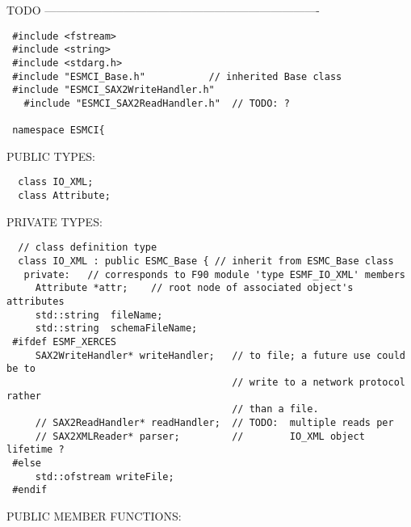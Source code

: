     TODO
  -------------------------------------------------------------------------
  
\begin{verbatim} #include <fstream>
 #include <string>
 #include <stdarg.h>
 #include "ESMCI_Base.h"           // inherited Base class
 #include "ESMCI_SAX2WriteHandler.h"
   #include "ESMCI_SAX2ReadHandler.h"  // TODO: ?
 
 namespace ESMCI{
 \end{verbatim}{\sf PUBLIC TYPES:}
\begin{verbatim}  class IO_XML;
  class Attribute;
 \end{verbatim}{\sf PRIVATE TYPES:}
\begin{verbatim} 
  // class definition type
  class IO_XML : public ESMC_Base { // inherit from ESMC_Base class
   private:   // corresponds to F90 module 'type ESMF_IO_XML' members
     Attribute *attr;    // root node of associated object's attributes
     std::string  fileName;
     std::string  schemaFileName;
 #ifdef ESMF_XERCES
     SAX2WriteHandler* writeHandler;   // to file; a future use could be to 
                                       // write to a network protocol rather
                                       // than a file.
     // SAX2ReadHandler* readHandler;  // TODO:  multiple reads per
     // SAX2XMLReader* parser;         //        IO_XML object lifetime ?
 #else
     std::ofstream writeFile;
 #endif
 \end{verbatim}{\sf PUBLIC MEMBER FUNCTIONS:}
